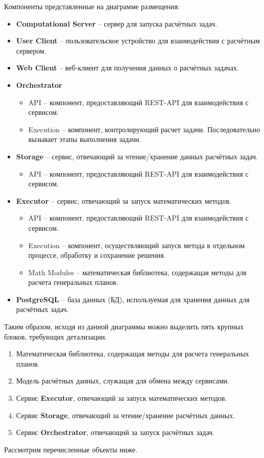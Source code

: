 \noindent Компоненты представленные на диаграмме размещения:
\begin{itemize}
	\item \textbf{Computational Server} -- сервер для запуска расчётных задач.
	\item \textbf{User Client} -- пользовательское устройство для взаимодействия с расчётным сервером.
	\item \textbf{Web Client} -- веб-клиент для получения данных о расчётных задачах.
	\item \textbf{Orchestrator}
	\begin{itemize}
		\item API -- компонент, предоставляющий REST-API для взаимодействия с сервисом.
		\item Execution -- компонент, контролирующий расчет задачи. Последовательно вызывает этапы выполнения задачи.
	\end{itemize}
	\item \textbf{Storage} -- сервис, отвечающий за чтение/хранение данных расчётных задач.
	\begin{itemize}
		\item API -- компонент, предоставляющий REST-API для взаимодействия с сервисом.
	\end{itemize}
	\item \textbf{Executor} -- сервис, отвечающий за запуск математических методов.
	\begin{itemize}
		\item API -- компонент, предоставляющий REST-API для взаимодействия с сервисом.
		\item Execution -- компонент, осуществляющий запуск метода в отдельном процессе, обработку и сохранение решения.
		\item Math Modules -- математическая библиотека, содержащая методы для расчета генеральных планов.
	\end{itemize}
	\item \textbf{PostgreSQL} -- база данных (БД), используемая для хранения данных для расчётных задач.
\end{itemize}

Таким образом, исходя из данной диаграммы можно выделить пять крупных блоков, требующих детализации.
\begin{enumerate}
	\item Математическая библиотека, содержащая методы для расчета генеральных планов.
	\item Модель расчётных данных, служащая для обмена между сервисами.
	\item Сервис \textbf{Executor}, отвечающий за запуск математических методов.
	\item Сервис \textbf{Storage}, отвечающий за чтение/хранение расчётных данных.
	\item Сервис \textbf{Orchestrator}, отвечающий за запуск расчётных задач.
\end{enumerate}

Рассмотрим перечисленные объекты ниже.